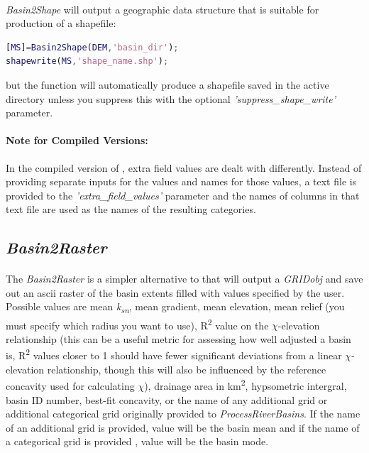 \paragraph{}\textit{Basin2Shape} will output a geographic data structure that is suitable for production of a shapefile:

\begin{lstlisting}[language=Matlab]
[MS]=Basin2Shape(DEM,'basin_dir');
shapewrite(MS,'shape_name.shp');
\end{lstlisting}

\noindent
but the function will automatically produce a shapefile saved in the active directory unless you suppress this with the optional \textit{'suppress\_shape\_write'} parameter. 

\paragraph{Note for Compiled Versions:} In the compiled version of , extra field values are dealt with differently. Instead of providing separate inputs for the values and names for those values, a text file is provided to the \textit{'extra\_field\_values'} parameter and the names of columns in that text file are used as the names of the resulting categories. 

\subsection{\textit{Basin2Raster}}
\paragraph{}The \textit{Basin2Raster} is a simpler alternative to  that will output a \textit{GRIDobj} and save out an ascii raster of the basin extents filled with values specified by the user. Possible values are mean \textit{k\textsubscript{sn}}, mean gradient, mean elevation, mean relief (you must specify which radius you want to use), R\textsuperscript{2} value on the $\chi$-elevation relationship (this can be a useful metric for assessing how well adjusted a basin is, R\textsuperscript{2} values closer to 1 should have fewer significant deviations from a linear $\chi$-elevation relationship, though this will also be influenced by the reference concavity used for calculating $\chi$), drainage area in km\textsuperscript{2}, hypsometric intergral, basin ID number, best-fit concavity, or the name of any additional grid or additional categorical grid originally provided to \textit{ProcessRiverBasins}. If the name of an additional grid is provided, value will be the basin mean and if the name of a categorical grid is provided , value will be the basin mode. 

